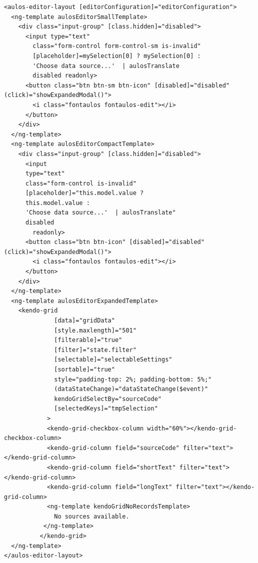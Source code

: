 \begin{lstlisting}[caption={Classe RefreshService}, style=html]
<aulos-editor-layout [editorConfiguration]="editorConfiguration">
  <ng-template aulosEditorSmallTemplate>
    <div class="input-group" [class.hidden]="disabled">
      <input type="text" 
        class="form-control form-control-sm is-invalid"
        [placeholder]=mySelection[0] ? mySelection[0] : 
        'Choose data source...'  | aulosTranslate 
        disabled readonly>
      <button class="btn btn-sm btn-icon" [disabled]="disabled" (click)="showExpandedModal()">
        <i class="fontaulos fontaulos-edit"></i>
      </button>
    </div>
  </ng-template>
  <ng-template aulosEditorCompactTemplate>
    <div class="input-group" [class.hidden]="disabled">
      <input 
      type="text" 
      class="form-control is-invalid" 
      [placeholder]="this.model.value ? 
      this.model.value : 
      'Choose data source...'  | aulosTranslate" 
      disabled
        readonly>
      <button class="btn btn-icon" [disabled]="disabled" (click)="showExpandedModal()">
        <i class="fontaulos fontaulos-edit"></i>
      </button>
    </div>
  </ng-template>
  <ng-template aulosEditorExpandedTemplate>
    <kendo-grid
              [data]="gridData"
              [style.maxlength]="501"
              [filterable]="true"
              [filter]="state.filter"
              [selectable]="selectableSettings"
              [sortable]="true"
              style="padding-top: 2%; padding-bottom: 5%;"
              (dataStateChange)="dataStateChange($event)"
              kendoGridSelectBy="sourceCode"
              [selectedKeys]="tmpSelection"
            >
            <kendo-grid-checkbox-column width="60%"></kendo-grid-checkbox-column>
            <kendo-grid-column field="sourceCode" filter="text"></kendo-grid-column>
            <kendo-grid-column field="shortText" filter="text"></kendo-grid-column>
            <kendo-grid-column field="longText" filter="text"></kendo-grid-column>
            <ng-template kendoGridNoRecordsTemplate>
              No sources available.
           </ng-template>
          </kendo-grid>
  </ng-template>
</aulos-editor-layout>
\end{lstlisting}